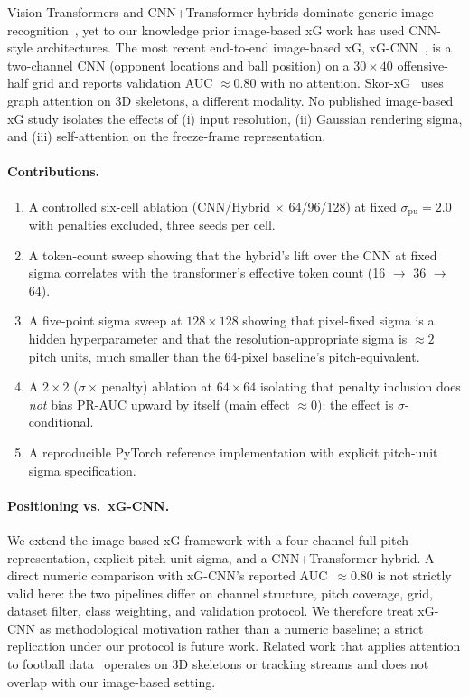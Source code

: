 \documentclass[runningheads,a4paper]{llncs}
\begin{document}
Vision Transformers and CNN+Transformer hybrids dominate generic image
recognition~\cite{vaswani2017attention,dosovitskiy2021vit}, yet to our
knowledge prior image-based xG work has used CNN-style architectures.
The most recent end-to-end image-based xG,
xG-CNN~\cite{matteotti2024xgcnn}, is a two-channel CNN (opponent
locations and ball position) on a $30{\times}40$ offensive-half grid
and reports validation AUC $\approx 0.80$ with no attention.
Skor-xG~\cite{xu2025skorxg} uses graph attention on 3D skeletons, a
different modality. No published image-based xG study isolates the
effects of (i) input resolution, (ii) Gaussian rendering sigma, and
(iii) self-attention on the freeze-frame representation.

\paragraph{Contributions.}
\begin{enumerate}\itemsep0pt
  \item A controlled six-cell ablation (CNN/Hybrid $\times$ 64/96/128) at
        fixed $\sigma_{\text{pu}}=2.0$ with penalties excluded,
        three seeds per cell.
  \item A token-count sweep showing that the hybrid's lift over the
        CNN at fixed sigma correlates with the transformer's effective
        token count (16 $\rightarrow$ 36 $\rightarrow$ 64).
  \item A five-point sigma sweep at $128{\times}128$ showing that
        pixel-fixed sigma is a hidden hyperparameter and that the
        resolution-appropriate sigma is $\approx 2$ pitch units,
        much smaller than the 64-pixel baseline's pitch-equivalent.
  \item A $2{\times}2$ ($\sigma{\times}$\,penalty) ablation at
        $64{\times}64$ isolating that penalty inclusion does
        \emph{not} bias PR-AUC upward by itself (main effect
        $\approx 0$); the effect is $\sigma$-conditional.
  \item A reproducible PyTorch reference implementation with explicit
        pitch-unit sigma specification.
\end{enumerate}

\paragraph{Positioning vs.\ xG-CNN.}
We extend the image-based xG framework with a four-channel full-pitch
representation, explicit pitch-unit sigma, and a CNN+Transformer
hybrid. A direct numeric comparison with xG-CNN's reported
AUC~$\approx 0.80$ is not strictly valid here: the two pipelines
differ on channel structure, pitch coverage, grid, dataset filter,
class weighting, and validation protocol. We therefore treat xG-CNN
as methodological motivation rather than a numeric baseline; a strict
replication under our protocol is future work. Related work that
applies attention to football data~\cite{xu2025skorxg,fernandez2021epv}
operates on 3D skeletons or tracking streams and does not overlap with
our image-based setting.
\end{document}
